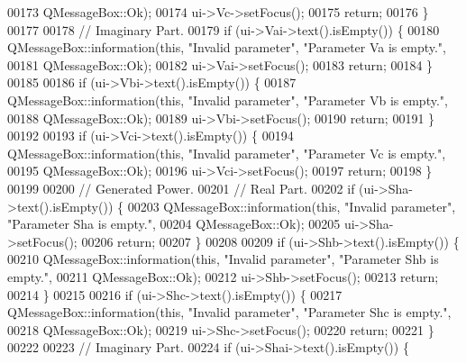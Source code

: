 \begin{DoxyCode}
00173                              QMessageBox::Ok);
00174     ui->Vc->setFocus();
00175     \textcolor{keywordflow}{return};
00176   \}
00177 
00178   \textcolor{comment}{// Imaginary Part.}
00179   \textcolor{keywordflow}{if} (ui->Vai->text().isEmpty()) \{
00180     QMessageBox::information(\textcolor{keyword}{this}, \textcolor{stringliteral}{"Invalid parameter"}, \textcolor{stringliteral}{"Parameter Va is empty."},
00181                              QMessageBox::Ok);
00182     ui->Vai->setFocus();
00183     \textcolor{keywordflow}{return};
00184   \}
00185 
00186   \textcolor{keywordflow}{if} (ui->Vbi->text().isEmpty()) \{
00187     QMessageBox::information(\textcolor{keyword}{this}, \textcolor{stringliteral}{"Invalid parameter"}, \textcolor{stringliteral}{"Parameter Vb is empty."},
00188                              QMessageBox::Ok);
00189     ui->Vbi->setFocus();
00190     \textcolor{keywordflow}{return};
00191   \}
00192 
00193   \textcolor{keywordflow}{if} (ui->Vci->text().isEmpty()) \{
00194     QMessageBox::information(\textcolor{keyword}{this}, \textcolor{stringliteral}{"Invalid parameter"}, \textcolor{stringliteral}{"Parameter Vc is empty."},
00195                              QMessageBox::Ok);
00196     ui->Vci->setFocus();
00197     \textcolor{keywordflow}{return};
00198   \}
00199 
00200   \textcolor{comment}{// Generated Power.}
00201   \textcolor{comment}{// Real Part.}
00202   \textcolor{keywordflow}{if} (ui->Sha->text().isEmpty()) \{
00203     QMessageBox::information(\textcolor{keyword}{this}, \textcolor{stringliteral}{"Invalid parameter"}, \textcolor{stringliteral}{"Parameter Sha is empty."},
00204                              QMessageBox::Ok);
00205     ui->Sha->setFocus();
00206     \textcolor{keywordflow}{return};
00207   \}
00208 
00209   \textcolor{keywordflow}{if} (ui->Shb->text().isEmpty()) \{
00210     QMessageBox::information(\textcolor{keyword}{this}, \textcolor{stringliteral}{"Invalid parameter"}, \textcolor{stringliteral}{"Parameter Shb is empty."},
00211                              QMessageBox::Ok);
00212     ui->Shb->setFocus();
00213     \textcolor{keywordflow}{return};
00214   \}
00215 
00216   \textcolor{keywordflow}{if} (ui->Shc->text().isEmpty()) \{
00217     QMessageBox::information(\textcolor{keyword}{this}, \textcolor{stringliteral}{"Invalid parameter"}, \textcolor{stringliteral}{"Parameter Shc is empty."},
00218                              QMessageBox::Ok);
00219     ui->Shc->setFocus();
00220     \textcolor{keywordflow}{return};
00221   \}
00222 
00223   \textcolor{comment}{// Imaginary Part.}
00224   \textcolor{keywordflow}{if} (ui->Shai->text().isEmpty()) \{

\end{DoxyCode}

